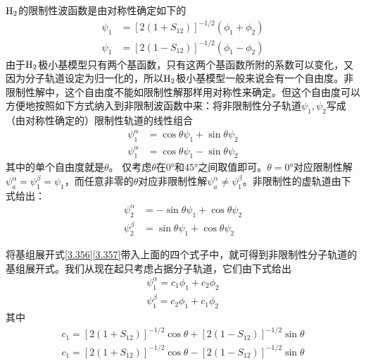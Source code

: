 $\mathrm{H}_2$的限制性波函数是由对称性确定如下的
\begin{align}
    \psi_1 &= [2(1+S_{12} )]^{-1/2}(\phi_1+\phi_2)
    \label{3.356}
    \\
    \psi_1 &= [2(1-S_{12})]^{-1/2}(\phi_1-\phi_2)
    \label{3.357}
\end{align}
由于$\mathrm{H}_2$极小基模型只有两个基函数，只有这两个基函数所附的系数可以变化，又因为分子轨道设定为归一化的，所以$\mathrm{H}_2$极小基模型一般来说会有一个自由度。非限制性解中，这个自由度不能如限制性解那样用对称性来确定。但这个自由度可以方便地按照如下方式纳入到非限制波函数中来：将非限制性分子轨道$\psi_1,\psi_2$写成（由对称性确定的）限制性轨道的线性组合
\begin{align}
    \psi_1^\alpha &= \cos\theta \psi_1 + \sin\theta \psi_2 \\
    \psi_1^\alpha &= \cos\theta \psi_1 - \sin\theta \psi_2 
\end{align}
其中的单个自由度就是$\theta$。 仅考虑$\theta$在$0\text{°}$和$45\text{°}$之间取值即可。$\theta=0\text{°}$对应限制性解$\psi_a^\alpha=\psi_1^\beta=\psi_1$，而任意非零的$\theta$对应非限制性解$\psi_a^\alpha \neq \psi_1^\beta$。非限制性的虚轨道由下式给出：
\begin{align}
\psi_2^\alpha &= - \sin\theta \psi_1 + \cos\theta \psi_2 \label{3.358}\\
\psi_2^\beta &=  \sin\theta \psi_1 + \cos\theta \psi_2 \label{3.359}
\end{align}

将基组展开式\eqref{3.356}\eqref{3.357}带入上面的四个式子中，就可得到非限制性分子轨道的基组展开式。我们从现在起只考虑占据分子轨道，它们由下式给出
\begin{align}
\psi_1^\alpha = c_1\phi_1 + c_2\phi_2 \label{3.362}\\
\psi_1^\beta = c_2\phi_1 + c_1\phi_2 \label{3.363}
\end{align}
其中
\begin{align}
c_1 = [2(1+S_{12} )]^{-1/2}\cos\theta + [2(1 - S_{12} )]^{-1/2}\sin\theta\\
c_1 = [2(1+S_{12} )]^{-1/2}\cos\theta - [2(1 - S_{12} )]^{-1/2}\sin\theta
\end{align}

